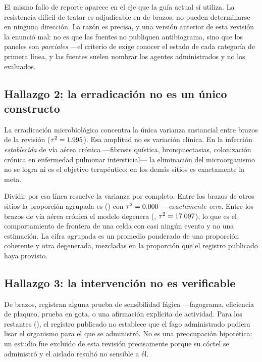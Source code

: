 \documentclass[12pt]{article}
\begin{document}
El mismo fallo de reporte aparece en el eje que la guía actual sí utiliza. La
resistencia difícil de tratar es adjudicable en \DtrAdjudicable de
\ArmsAnalysed brazos; \DtrNotDerivableArms no pueden determinarse en ninguna
dirección. La razón es precisa, y una versión anterior de esta revisión la
enunció mal: no es que las fuentes no publiquen antibiograma, sino que los
paneles son \emph{parciales} ---el criterio de \citeauthor{Kadri2018_dtr} exige
conocer el estado de cada categoría de primera línea, y las fuentes suelen
nombrar los agentes administrados y no los evaluados.

\subsection*{Hallazgo 2: la erradicación no es un único constructo}

La erradicación microbiológica concentra la única varianza sustancial entre
brazos de la revisión ($\tau^2=1.995$). Esa amplitud no es variación
clínica. En la infección \emph{establecida} de vía aérea crónica ---fibrosis
quística, bronquiectasias, colonización crónica en enfermedad pulmonar
intersticial--- la eliminación del microorganismo no se logra ni es el objetivo
terapéutico; en los demás sitios es exactamente la meta.

Dividir por esa línea resuelve la varianza por completo. Entre los
\EradOtherArms brazos de otros sitios la proporción agrupada es \EradOtherEst
(\EradOtherCI) con $\tau^2=0.000$ ---\emph{exactamente cero}. Entre los
\EradAirArms brazos de vía aérea crónica el modelo degenera (\EradAirEst,
$\tau^2=17.097$), lo que es el comportamiento de frontera de una celda con
casi ningún evento y no una estimación. La cifra agrupada es un promedio
ponderado de una proporción coherente y otra degenerada, mezcladas en la
proporción que el registro publicado haya provisto.

\subsection*{Hallazgo 3: la intervención no es verificable}

De \PhageSuscArms brazos, \PhageSuscDocumented registran alguna prueba de
sensibilidad fágica ---fagograma, eficiencia de plaqueo, prueba en gota, o una
afirmación explícita de actividad. Para los \PhageSuscSilent restantes
(\PhageSuscSilentPct), el registro publicado no establece que el fago
administrado pudiera lisar el organismo para el que se administró. No es una
preocupación hipotética: un estudio fue excluido de esta revisión precisamente
porque su cóctel se administró y el aislado resultó no sensible a él.
\end{document}
